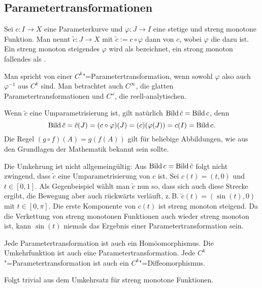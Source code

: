 \subsection{Parametertransformationen}

\begin{definition}
Sei $c\colon I\to X$ eine Parameterkurve und $\varphi\colon J\to I$
eine stetige und streng monotone Funktion. Man nennt
$\tilde c\colon J\to X$ mit $\tilde c:=c\circ\varphi$ dann
 von $c$, wobei $\varphi$ die
 dazu ist. Ein streng monoton steigendes
$\varphi$ wird als  bezeichnet,
ein strong monoton fallendes als .

Man spricht von einer $C^k$"=Parametertransformation, wenn sowohl
$\varphi$ also auch $\varphi^{-1}$ aus $C^k$ sind. Man betrachtet
auch $C^\infty$, die glatten Parametertransformationen und
$C^\omega$, die reell-analytischen.
\end{definition}

\noindent
Wenn $\tilde c$ eine Umparametrisierung ist, gilt natürlich
$\operatorname{Bild}\tilde c=\operatorname{Bild} c$, denn
\begin{equation}
\operatorname{Bild}\tilde c = \tilde c(J)
= (c\circ\varphi)(J) = (c)(\varphi(J))
= c(I) = \operatorname{Bild} c.
\end{equation}
Die Regel $(g\circ f)(A)=g(f(A))$ gilt für beliebige Abbildungen,
wie aus den Grundlagen der Mathematik bekannt sein sollte.

Die Umkehrung ist nicht allgemeingültig: Aus
$\operatorname{Bild} c=\operatorname{Bild}\tilde c$ folgt nicht zwingend, dass
$\tilde c$ eine Umparametrisierung von $c$ ist. Sei
$c(t)=(t,0)$ und $t\in[0,1]$. Als Gegenbeispiel wählt man
$\tilde c$ nun so, dass sich auch diese Strecke ergibt, die
Bewegung aber auch rückwärts verläuft, z.\,B. $\tilde c(t)=(\sin(t),0)$
mit $t\in[0,\pi]$. Die erste Komponente von $c(t)$ ist streng
monoton steigend. Da die Verkettung von streng monotonen Funktionen
auch wieder streng monoton ist, kann $\sin(t)$ niemals das Ergebnis
einer Parametertransformation sein.

\begin{corollary}
Jede Parametertransformation ist auch ein
Homöomorphismus. Die Umkehrfunktion ist auch eine
Parametertransformation. Jede $C^k$"=Parametertransformation
ist auch ein $C^k$"=Diffeomorphismus.
\end{corollary}

\noindent{}
Folgt trivial aus dem Umkehrsatz für streng monotone
Funktionen.\;\qedsymbol

